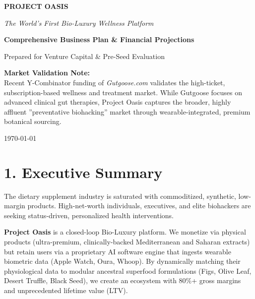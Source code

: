 \documentclass[11pt,a4paper]{article}
\begin{document}
\begin{titlepage}
    \centering
    \vspace*{2cm}
    
    {\Huge\bfseries\color{charcoal} PROJECT OASIS\par}
    \vspace{0.5cm}
    {\Large\itshape The World's First Bio-Luxury Wellness Platform\par}
    \vspace{2cm}
    
    {\Large \textbf{Comprehensive Business Plan \& Financial Projections}\par}
    \vspace{1cm}
    {\large Prepared for Venture Capital \& Pre-Seed Evaluation\par}
    \vspace{3cm}
    
    \begin{flushleft}
    \textbf{Market Validation Note:} \\
    Recent Y-Combinator funding of \textit{Gutgoose.com} validates the high-ticket, subscription-based wellness and treatment market. While Gutgoose focuses on advanced clinical gut therapies, Project Oasis captures the broader, highly affluent ''preventative biohacking'' market through wearable-integrated, premium botanical sourcing.
    \end{flushleft}
    
    \vfill
    {\large \today\par}
\end{titlepage}

\tableofcontents
\newpage

\section{1. Executive Summary}
The dietary supplement industry is saturated with commoditized, synthetic, low-margin products. High-net-worth individuals, executives, and elite biohackers are seeking status-driven, personalized health interventions. 

\textbf{Project Oasis} is a closed-loop Bio-Luxury platform. We monetize via physical products (ultra-premium, clinically-backed Mediterranean and Saharan extracts) but retain users via a proprietary AI software engine that ingests wearable biometric data (Apple Watch, Oura, Whoop). By dynamically matching their physiological data to modular ancestral superfood formulations (Figs, Olive Leaf, Desert Truffle, Black Seed), we create an ecosystem with 80\%+ gross margins and unprecedented lifetime value (LTV).
\end{document}
